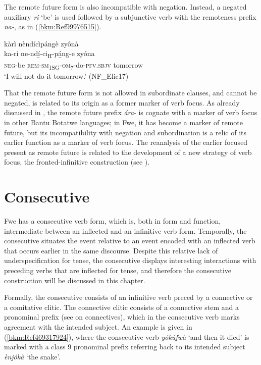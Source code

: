 The remote future form is also incompatible with negation. Instead, a negated auxiliary \textit{ri} ‘be’ is used followed by a subjunctive verb with the remoteness prefix \textit{na-}, as in (\ref{bkm:Ref99976515}).

\ea
\label{bkm:Ref99976515}
kàrì nèndícìpángè zyônà\\
\gll ka-ri    ne-ndí̲-ci\textsubscript{H}-pá̲ng-e      zyóna\\
\textsc{neg}-be  \textsc{rem}-\textsc{sm}\textsubscript{1SG}-\textsc{om}\textsubscript{7}-do-\textsc{pfv}.\textsc{sbjv}  tomorrow\\
\glt ‘I will not do it tomorrow.’ (NF\_Elic17)
\z

That the remote future form is not allowed in subordinate clauses, and cannot be negated, is related to its origin as a former marker of verb focus. As already discussed in , the remote future prefix \textit{ára}- is cognate with a marker of verb focus in other Bantu Botatwe languages; in Fwe, it has become a marker of remote future, but its incompatibility with negation and subordination is a relic of its earlier function as a marker of verb focus. The reanalysis of the earlier focused present as remote future is related to the development of a new strategy of verb focus, the fronted-infinitive construction (see ).

\section{Consecutive}
\label{bkm:Ref494204746}\hypertarget{Toc75352688}{}
Fwe has a consecutive verb form, which is, both in form and function, intermediate between an inflected and an infinitive verb form. Temporally, the consecutive situates the event relative to an event encoded with an inflected verb that occurs earlier in the same discourse. Despite this relative lack of underspecification for tense, the consecutive displays interesting interactions with preceding verbs that are inflected for tense, and therefore the consecutive construction will be discussed in this chapter.

Formally, the consecutive consists of an infinitive verb preced by a connective or a comitative clitic. The connective clitic consists of a connective stem and a pronominal prefix (see  on connectives), which in the consecutive verb marks agreement with the intended subject. An example is given in (\ref{bkm:Ref469317924}), where the consecutive verb \textit{yókúfwà} ‘and then it died’ is marked with a class 9 pronominal prefix referring back to its intended subject \textit{ènjókà} ‘the snake’.

